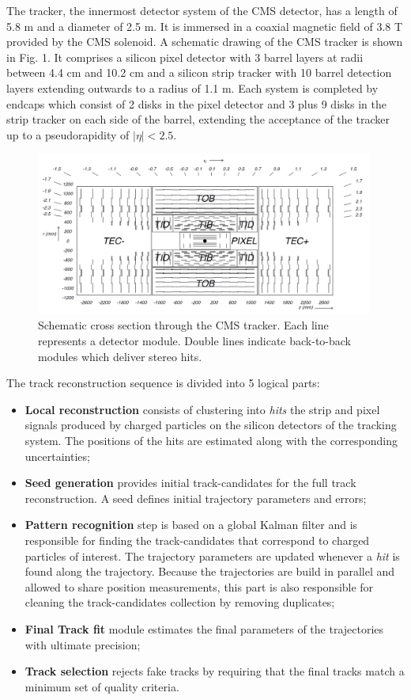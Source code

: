The tracker, the innermost detector system of the CMS detector, has a length
of 5.8 m and a
diameter of 2.5 m. It is immersed in a coaxial magnetic field of 3.8 T
provided by the CMS solenoid. A schematic drawing of the CMS tracker is shown in
Fig. 1. It comprises a silicon pixel detector with 3 barrel layers at radii
between 4.4 cm and 10.2 cm and a silicon strip tracker with 10 barrel
detection layers extending outwards to a radius of 1.1 m. Each system is
completed by endcaps which consist of 2 disks in the pixel detector and 3
plus 9 disks in the strip tracker on each side of the barrel, extending
the acceptance of the tracker up to a pseudorapidity of $|\eta| < 2.5$.
\begin{figure}[!h]
\centering
\includegraphics[width=0.99\textwidth]{plots/intro/tracker.png}
\caption{Schematic cross section through the CMS tracker. Each line represents a
detector module. Double lines indicate back-to-back modules which deliver stereo
hits.}
\end{figure}

The track reconstruction sequence is divided into 5 logical parts:
\begin{itemize}
\item \textbf{Local reconstruction} consists of clustering into \textit{hits}
the strip and pixel signals produced by charged particles on the silicon
detectors of the tracking system. The positions of the hits are estimated along
with the corresponding uncertainties;
\item \textbf{Seed generation} provides initial track-candidates for the full
track reconstruction. A seed defines initial trajectory parameters and errors;
\item \textbf{Pattern recognition} step is based on a global Kalman filter and
is responsible for finding the track-candidates that correspond to charged
particles of interest. The trajectory parameters are updated whenever a \textit{hit} is found
along the trajectory. Because the trajectories are build in parallel and allowed to share position
measurements, this part is also responsible for
cleaning the track-candidates collection by removing duplicates;
\item \textbf{Final Track fit} module estimates the final parameters of the trajectories
with ultimate precision;
\item \textbf{Track selection} rejects fake tracks by requiring that the final
tracks match a minimum set of quality criteria.
\end{itemize}

